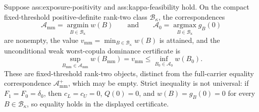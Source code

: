Suppose ass:exposure-positivity and ass:kappa-feasibility hold.  On the compact fixed-threshold positive-definite rank-two class \(\mathcal B_\kappa\), the correspondences
\[
\mathcal A_{\mathrm{mm}}=\operatorname*{argmin}_{B\in\mathcal B_\kappa}w(B)
\qquad\text{and}\qquad
\mathcal A_0=\operatorname*{argmax}_{B\in\mathcal B_\kappa}g_B(0)
\]
are nonempty, the value \(v_{\mathrm{mm}}=\min_{B\in\mathcal B_\kappa}w(B)\) is attained, and the unconditional weak worst-copula dominance certificate is
\[
\sup_{B_{\mathrm{mm}}\in\mathcal A_{\mathrm{mm}}}w(B_{\mathrm{mm}})
=v_{\mathrm{mm}}
\le
\inf_{B_0\in\mathcal A_0}w(B_0).
\]
These are fixed-threshold rank-two objects, distinct from the full-carrier equality correspondence \(\mathcal A_{\mathrm{mm}}^+\), which may be empty.  Strict inequality is not universal: if \(F_1=F_0=\delta_0\), then \(c_L=c_U=0\), \(Q(0)=0\), and \(w(B)=g_B(0)=0\) for every \(B\in\mathcal B_\kappa\), so equality holds in the displayed certificate.